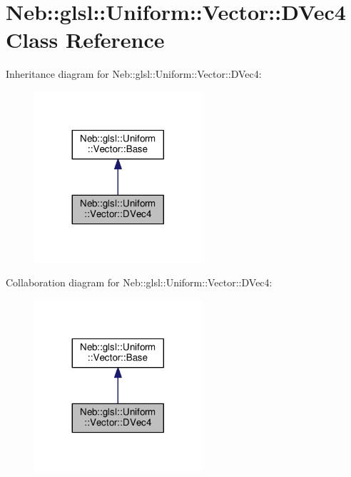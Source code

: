 \hypertarget{classNeb_1_1glsl_1_1Uniform_1_1Vector_1_1DVec4}{\section{Neb\-:\-:glsl\-:\-:Uniform\-:\-:Vector\-:\-:D\-Vec4 Class Reference}
\label{classNeb_1_1glsl_1_1Uniform_1_1Vector_1_1DVec4}
}


Inheritance diagram for Neb\-:\-:glsl\-:\-:Uniform\-:\-:Vector\-:\-:D\-Vec4\-:
\nopagebreak
\begin{figure}[H]
\begin{center}
\leavevmode
\includegraphics[width=176pt]{classNeb_1_1glsl_1_1Uniform_1_1Vector_1_1DVec4__inherit__graph}
\end{center}
\end{figure}


Collaboration diagram for Neb\-:\-:glsl\-:\-:Uniform\-:\-:Vector\-:\-:D\-Vec4\-:
\nopagebreak
\begin{figure}[H]
\begin{center}
\leavevmode
\includegraphics[width=176pt]{classNeb_1_1glsl_1_1Uniform_1_1Vector_1_1DVec4__coll__graph}
\end{center}
\end{figure}
